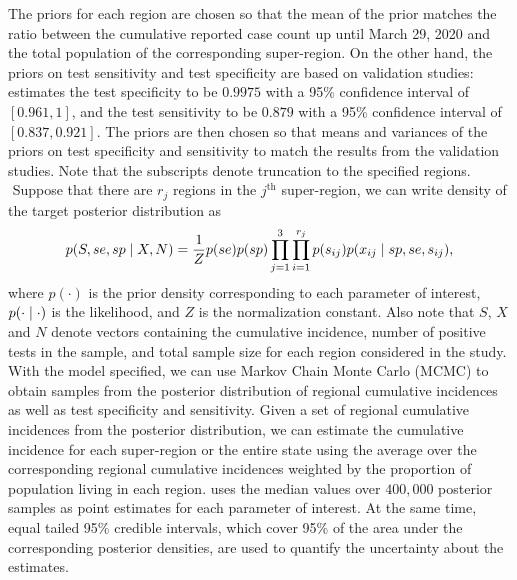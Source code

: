 The priors for each region are chosen so that the mean of the prior matches the ratio between the cumulative reported case count up until March 29, 2020 and the total population of the corresponding super-region. On the other hand, the priors on test sensitivity and test specificity are based on validation studies: \cite{rosenberg2020cumulative} estimates the test specificity to be $0.9975$ with a 95\% confidence interval of $[0.961, 1]$, and the test sensitivity to be $0.879$ with a 95\% confidence interval of $[0.837, 0.921]$. The priors are then chosen so that means and variances of the priors on test specificity and sensitivity to match the results from the validation studies. Note that the subscripts denote truncation to the specified regions.\\
\newline$ $
Suppose that there are $r_j$ regions in the $j^\text{th}$ super-region, we can write density of the target posterior distribution as
\[
p(S, se, sp \mid X, N) = \frac{1}{Z}p(se)p(sp)\prod_{j=1}^3\prod_{i=1}^{r_j} p(s_{ij})p(x_{ij}\mid sp, se, s_{ij}),
\]
where $p(\cdot)$ is the prior density corresponding to each parameter of interest, $p(\cdot \mid \cdot)$ is the likelihood, and $Z$ is the normalization constant. Also note that $S$, $X$ and $N$ denote vectors containing the cumulative incidence, number of positive tests in the sample, and total sample size for each region considered in the study. With the model specified, we can use Markov Chain Monte Carlo (MCMC) to obtain samples from the posterior distribution of regional cumulative incidences as well as test specificity and sensitivity. Given a set of regional cumulative incidences from the posterior distribution, we can estimate the cumulative incidence for each super-region or the entire state using the average over the corresponding regional cumulative incidences weighted by the proportion of population living in each region. \cite{meyer2022adjusting} uses the median values over $400,000$ posterior samples as point estimates for each parameter of interest. At the same time, equal tailed 95\% credible intervals, which cover 95\% of the area under the corresponding posterior densities, are used to quantify the uncertainty about the estimates.
